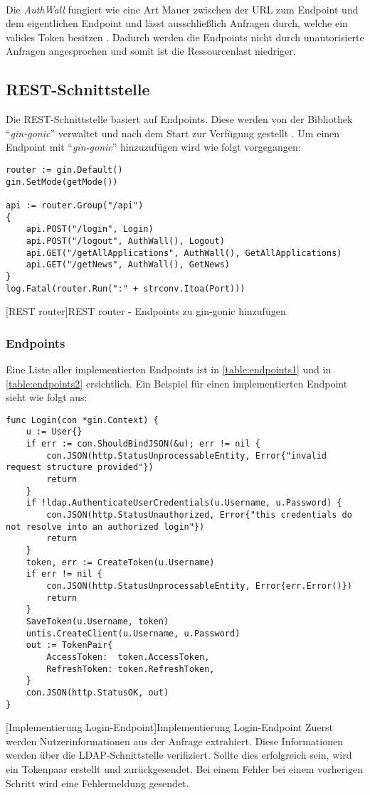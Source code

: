 ~\\
Die \textit{AuthWall} fungiert wie eine Art Mauer zwischen der URL zum Endpoint und dem eigentlichen Endpoint und lässt ausschließlich Anfragen durch, welche ein valides Token besitzen \cite{tokenmanager}. Dadurch werden die Endpoints nicht durch unautorisierte Anfragen angesprochen und somit ist die Ressourcenlast niedriger.

\newpage

\subsection{REST-Schnittstelle}
Die REST-Schnittstelle basiert auf Endpoints. Diese werden von der Bibliothek \enquote{\textit{gin-gonic}} verwaltet und nach dem Start zur Verfügung gestellt \cite{gingonic}. Um einen Endpoint mit \enquote{\textit{gin-gonic}} hinzuzufügen wird wie folgt vorgegangen:

\begin{verbatim}
router := gin.Default()
gin.SetMode(getMode())

api := router.Group("/api")
{
	api.POST("/login", Login)
	api.POST("/logout", AuthWall(), Logout)
	api.GET("/getAllApplications", AuthWall(), GetAllApplications)
	api.GET("/getNews", AuthWall(), GetNews)
}
log.Fatal(router.Run(":" + strconv.Itoa(Port)))
\end{verbatim} 
[REST router]{REST router - Endpoints zu gin-gonic hinzufügen}

\subsubsection{Endpoints}

Eine Liste aller implementierten Endpoints ist in \autoref{table:endpoints1} und in \autoref{table:endpoints2} ersichtlich. Ein Beispiel für einen implementierten Endpoint sieht wie folgt aus:

\begin{verbatim}
func Login(con *gin.Context) {
	u := User{}
	if err := con.ShouldBindJSON(&u); err != nil {
		con.JSON(http.StatusUnprocessableEntity, Error{"invalid request structure provided"})
		return
	}
	if !ldap.AuthenticateUserCredentials(u.Username, u.Password) {
		con.JSON(http.StatusUnauthorized, Error{"this credentials do not resolve into an authorized login"})
		return
	}
	token, err := CreateToken(u.Username)
	if err != nil {
		con.JSON(http.StatusUnprocessableEntity, Error{err.Error()})
		return
	}
	SaveToken(u.Username, token)
	untis.CreateClient(u.Username, u.Password)
	out := TokenPair{
		AccessToken:  token.AccessToken,
		RefreshToken: token.RefreshToken,
	}
	con.JSON(http.StatusOK, out)
}
\end{verbatim}
[Implementierung Login-Endpoint]{Implementierung Login-Endpoint}
Zuerst werden Nutzerinformationen aus der Anfrage extrahiert. Diese Informationen werden über die LDAP-Schnittstelle verifiziert. Sollte dies erfolgreich sein, wird ein Tokenpaar erstellt und zurückgesendet. Bei einem Fehler bei einem vorherigen Schritt wird eine Fehlermeldung gesendet.

